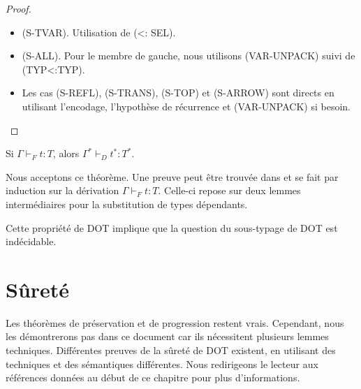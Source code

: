 \begin{proof}
  \begin{itemize}
  \item (S-TVAR). Utilisation de (<: SEL).
  \item (S-ALL). Pour le membre de gauche, nous utilisons (VAR-UNPACK) suivi de
    (TYP<:TYP).
  \item Les cas (S-REFL), (S-TRANS), (S-TOP) et (S-ARROW) sont directs
    en utilisant l'encodage, l'hypothèse de récurrence et (VAR-UNPACK)
    si besoin.
  \end{itemize}
\end{proof}

\begin{theorem}
  Si $\Gamma \vdash_{F} t : T$, alors $\Gamma^{*} \vdash_{D} t^{*} : T^{*}$.
\end{theorem}

Nous acceptons ce théorème. Une preuve peut être trouvée dans
\cite{WF-DOT-2016} et se fait par induction sur la dérivation $\Gamma \vdash_{F}
t : T$. Celle-ci repose sur deux lemmes intermédiaires pour la
substitution de types dépendants.

Cette propriété de DOT implique que la question du sous-typage de DOT est
indécidable.


\section{Sûreté}

Les théorèmes de préservation et de progression
restent vrais. Cependant, nous les démontrerons pas dans ce document car ils
nécessitent plusieurs lemmes techniques. Différentes preuves de la sûreté de DOT
existent, en utilisant des techniques et des sémantiques différentes. Nous
redirigeons le lecteur aux références données au début de ce chapitre pour plus d'informations.